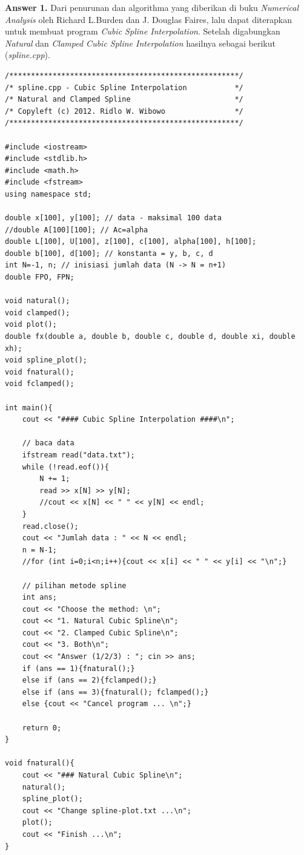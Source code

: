 \documentclass[paper=a4, fontsize=11pt]{scrartcl}
\numberwithin{equation}{section} %
\numberwithin{figure}{section} %
\numberwithin{table}{section} %
\begin{document}
\newpage
\large \textbf{Answer 1.}
Dari penurunan dan algorithma yang diberikan di buku \textit{Numerical Analysis} oleh Richard L.Burden dan J. Douglas Faires, lalu dapat diterapkan untuk membuat program \textit{Cubic Spline Interpolation}. Setelah digabungkan \textit{Natural} dan \textit{Clamped Cubic Spline Interpolation} hasilnya sebagai berikut (\textit{spline.cpp}).

\begin{small}
\begin{verbatim}
/*****************************************************/
/* spline.cpp - Cubic Spline Interpolation           */
/* Natural and Clamped Spline                        */
/* Copyleft (c) 2012. Ridlo W. Wibowo                */
/*****************************************************/

#include <iostream>
#include <stdlib.h>
#include <math.h>
#include <fstream>
using namespace std;

double x[100], y[100]; // data - maksimal 100 data
//double A[100][100]; // Ac=alpha
double L[100], U[100], z[100], c[100], alpha[100], h[100];
double b[100], d[100]; // konstanta = y, b, c, d
int N=-1, n; // inisiasi jumlah data (N -> N = n+1)
double FPO, FPN;

void natural();
void clamped();
void plot();
double fx(double a, double b, double c, double d, double xi, double xh);
void spline_plot();
void fnatural();
void fclamped();

int main(){ 
    cout << "#### Cubic Spline Interpolation ####\n";

    // baca data
    ifstream read("data.txt");
    while (!read.eof()){
        N += 1;
        read >> x[N] >> y[N];
        //cout << x[N] << " " << y[N] << endl; 
    }
    read.close();
    cout << "Jumlah data : " << N << endl;
    n = N-1;
    //for (int i=0;i<n;i++){cout << x[i] << " " << y[i] << "\n";}
        
    // pilihan metode spline
    int ans;
    cout << "Choose the method: \n";
    cout << "1. Natural Cubic Spline\n";
    cout << "2. Clamped Cubic Spline\n";
    cout << "3. Both\n";
    cout << "Answer (1/2/3) : "; cin >> ans;
    if (ans == 1){fnatural();}
    else if (ans == 2){fclamped();}
    else if (ans == 3){fnatural(); fclamped();}
    else {cout << "Cancel program ... \n";}

    return 0;
}

void fnatural(){
    cout << "### Natural Cubic Spline\n";
    natural(); 
    spline_plot(); 
    cout << "Change spline-plot.txt ...\n";
    plot();
    cout << "Finish ...\n";
}


\end{verbatim}
\end{small}
\end{document}
